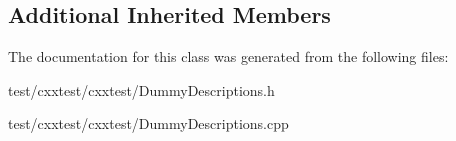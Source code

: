\subsection*{Additional Inherited Members}


The documentation for this class was generated from the following files\-:\begin{DoxyCompactItemize}
\item 
test/cxxtest/cxxtest/Dummy\-Descriptions.\-h\item 
test/cxxtest/cxxtest/Dummy\-Descriptions.\-cpp\end{DoxyCompactItemize}
